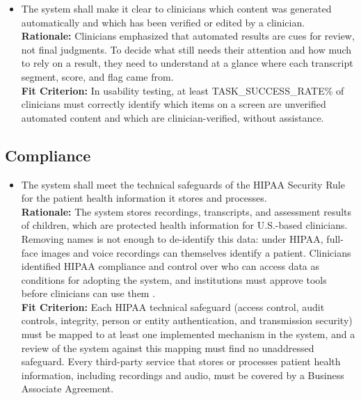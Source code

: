 \documentclass[12pt]{article}
\newcounter{nfrnum} %
\newcommand{\rthenfrnum}{NFR\thenfrnum}
\begin{document}
\noindent \begin{itemize}

\item[\textbf{\rthenfrnum}:]
\label{NFR-UN1}
  The system shall make it clear to clinicians which content was generated automatically and which has been verified or edited by a clinician.
  \\ \textbf{Rationale:} Clinicians emphasized that automated results are cues for review, not final judgments. To decide what still needs their attention and how much to rely on a result, they need to understand at a glance where each transcript segment, score, and flag came from.
  \\ \textbf{Fit Criterion:} In usability testing, at least TASK\_SUCCESS\_RATE\% of clinicians must correctly identify which items on a screen are unverified automated content and which are clinician-verified, without assistance.

\end{itemize}

\subsection{Compliance}

\noindent \begin{itemize}

\item[\textbf{\rthenfrnum}:]
\label{NFR-CO1}
  The system shall meet the technical safeguards of the HIPAA Security Rule for the patient health information it stores and processes.
  \\ \textbf{Rationale:} The system stores recordings, transcripts, and assessment results of children, which are protected health information for U.S.-based clinicians. Removing names is not enough to de-identify this data: under HIPAA, full-face images and voice recordings can themselves identify a patient. Clinicians identified HIPAA compliance and control over who can access data as conditions for adopting the system, and institutions must approve tools before clinicians can use them \citep{CDC_HIPAA_1996}.
  \\ \textbf{Fit Criterion:} Each HIPAA technical safeguard (access control, audit controls, integrity, person or entity authentication, and transmission security) must be mapped to at least one implemented mechanism in the system, and a review of the system against this mapping must find no unaddressed safeguard. Every third-party service that stores or processes patient health information, including recordings and audio, must be covered by a Business Associate Agreement.

\end{itemize}
\end{document}
